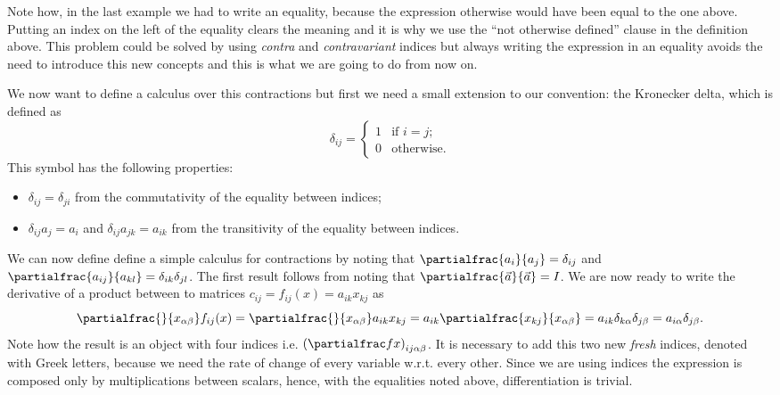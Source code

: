 \documentclass{article}
\begin{document}
Note how, in the last example we had to write an equality, because the
expression otherwise would have been equal to the one above. Putting an index on
the left of the equality clears the meaning and it is why we use
the ``not otherwise defined'' clause in the definition above. This problem could
be solved by using \emph{contra} and \emph{contravariant} indices but always
writing the expression in an equality avoids the need to introduce this new
concepts and this is what we are going to do from now on.

We now want to define a calculus over this contractions but first we need a
small extension to our convention: the Kronecker delta, which is defined as
\[
\delta_{ij} = \left\{\begin{array}{ll}
                     1 & \mbox{if \(i = j\)}; \\
                     0 & \mbox{otherwise}.
                     \end{array}\right.
\] This symbol has the following properties:
\begin{itemize}
\item \(\delta_{ij} = \delta_{ji}\) from the commutativity of the equality
between indices;
\item \(\delta_{ij} a_j = a_i\) and \(\delta_{ij} a_{jk} = a_{ik}\) from the
transitivity of the equality between indices.
\end{itemize}

We can now define define a simple calculus for contractions by noting that
\(\partialfrac{a_i}{a_j} = \delta_{ij}\) and
\(\partialfrac{a_{ij}}{a_{kl}} = \delta_{ik}\delta_{jl}\). The first result
follows from noting that \(\partialfrac{\vec a}{\vec a} = I\). We are now ready
to write the derivative of a product between to matrices
\(c_{ij} = f_{ij}(x) = a_{ik} x_{kj}\) as \[
\partialfrac{}{x_{\alpha\beta}} f_{ij}(x)
= \partialfrac{}{x_{\alpha\beta}} a_{ik} x_{kj}
= a_{ik} \partialfrac{x_{kj}}{x_{\alpha\beta}}
= a_{ik} \delta_{k\alpha} \delta_{j\beta}
= a_{i\alpha} \delta_{j\beta}.
\] Note how the result is an object with four indices i.e.
\(\left(\partialfrac f x\right)_{ij\alpha\beta}\). It is necessary to add this
two new \emph{fresh} indices, denoted with Greek letters, because we need the
rate of change of every variable w.r.t. every other. Since we are using indices
the expression is composed only by multiplications between scalars, hence, with
the equalities noted above, differentiation is trivial.
\end{document}
